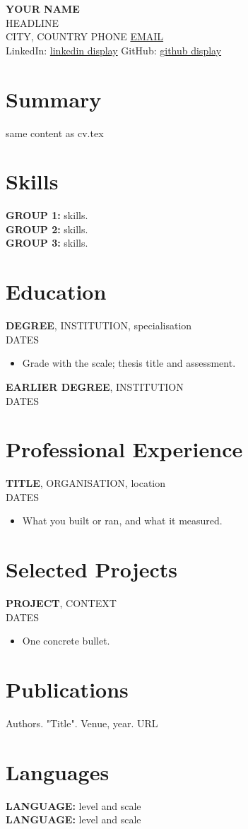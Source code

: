 \documentclass[11pt]{article}
\newcommand{\entry}[3]{\textbf{#1}, #2\\#3\par\vspace{1pt}}
\begin{document}
\begin{center}
  {\LARGE\textbf{{{YOUR NAME}}}}\\[2pt]
  {{HEADLINE}}\\[3pt]
  {{CITY, COUNTRY}} \textbar{} {{PHONE}} \textbar{} \href{mailto:{{EMAIL}}}{{{EMAIL}}}\\
  LinkedIn: \href{{{LINKEDIN URL}}}{{{linkedin display}}} \textbar{} GitHub: \href{{{GITHUB URL}}}{{{github display}}}
\end{center}

\raggedright

\section{Summary}
{{same content as cv.tex}}

\section{Skills}
\textbf{{{GROUP 1}}:} {{skills}}.\\
\textbf{{{GROUP 2}}:} {{skills}}.\\
\textbf{{{GROUP 3}}:} {{skills}}.

\section{Education}
\entry{{{DEGREE}}}{{{INSTITUTION, specialisation}}}{{{DATES}}}
\begin{itemize}
  \item {{Grade with the scale; thesis title and assessment.}}
\end{itemize}
\entry{{{EARLIER DEGREE}}}{{{INSTITUTION}}}{{{DATES}}}

\section{Professional Experience}

\entry{{{TITLE}}}{{{ORGANISATION, location}}}{{{DATES}}}
\begin{itemize}
  \item {{What you built or ran, and what it measured.}}
\end{itemize}


\section{Selected Projects}

\entry{{{PROJECT}}}{{{CONTEXT}}}{{{DATES}}}
\begin{itemize}
  \item {{One concrete bullet.}}
\end{itemize}

\section{Publications}
{{Authors. "Title". Venue, year. URL}}

\section{Languages}
\textbf{{{LANGUAGE}}:} {{level and scale}}\\
\textbf{{{LANGUAGE}}:} {{level and scale}}
\end{document}
